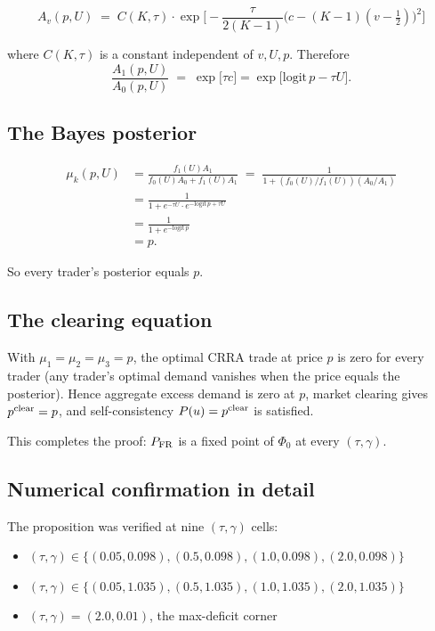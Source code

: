 \documentclass[11pt]{article}
\newcommand{\1}{\mathbf{1}}
\newcommand{\PFR}{P_{\rm FR}}
\begin{document}
\begin{equation}
A_v(p, U) \;=\; C(K, \tau) \cdot \exp\biggl[-\frac{\tau}{2(K-1)}\bigl(c - (K-1)(v-\tfrac12)\bigr)^2\biggr]
\end{equation}

where $C(K, \tau)$ is a constant independent of $v, U, p$.  Therefore
\begin{equation}
\frac{A_1(p, U)}{A_0(p, U)} \;=\; \exp\biggl[\tau c\biggr] = \exp\biggl[\mathrm{logit}\,p - \tau U\biggr].
\end{equation}

\subsection{The Bayes posterior}

\begin{align}
\mu_k(p, U) &= \frac{f_1(U) A_1}{f_0(U) A_0 + f_1(U) A_1}
\;=\; \frac{1}{1 + (f_0(U)/f_1(U))(A_0/A_1)} \\
&= \frac{1}{1 + e^{-\tau U} \cdot e^{-\mathrm{logit}\,p + \tau U}} \\
&= \frac{1}{1 + e^{-\mathrm{logit}\,p}} \\
&= p.
\end{align}

So every trader's posterior equals $p$.

\subsection{The clearing equation}

With $\mu_1 = \mu_2 = \mu_3 = p$, the optimal CRRA trade at price $p$
is zero for every trader (any trader's optimal demand vanishes when
the price equals the posterior).  Hence aggregate excess demand is
zero at $p$, market clearing gives $p^{\rm clear} = p$, and
self-consistency $P(u) = p^{\rm clear}$ is satisfied.

This completes the proof: $\PFR$ is a fixed point of $\Phi_0$ at every
$(\tau, \gamma)$.

\subsection{Numerical confirmation in detail}

The proposition was verified at nine $(\tau, \gamma)$ cells:
\begin{itemize}
\item $(\tau, \gamma) \in \{(0.05, 0.098), (0.5, 0.098), (1.0, 0.098), (2.0, 0.098)\}$
\item $(\tau, \gamma) \in \{(0.05, 1.035), (0.5, 1.035), (1.0, 1.035), (2.0, 1.035)\}$
\item $(\tau, \gamma) = (2.0, 0.01)$, the max-deficit corner
\end{itemize}
\end{document}
